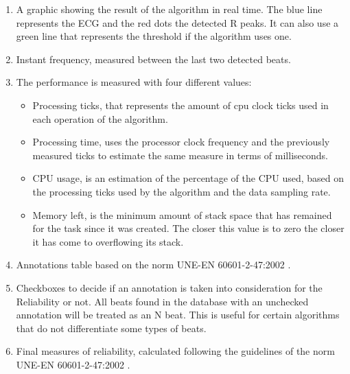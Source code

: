 \begin{enumerate}
    \item  A graphic showing the result of the algorithm in real time. The blue line represents the ECG and the red dots the detected R peaks. It can also use a green line that represents the threshold if the algorithm uses one.
    \item Instant frequency, measured between the last two detected beats.
    \item The performance is measured with four different values:
    \begin{itemize}
        \item Processing ticks, that represents the amount of cpu clock ticks used in each operation of the algorithm.
        \item Processing time, uses the processor clock frequency and the previously measured ticks to estimate the same measure in terms of milliseconds.
        \item CPU usage, is an estimation of the percentage of the CPU used, based on the processing ticks used by the algorithm and the data sampling rate.
        \item Memory left, is the minimum amount of stack space that has remained for the task since it was created.  The closer this value is to zero the closer it has come to overflowing its stack.
    \end{itemize}
    \item Annotations table based on the norm UNE-EN 60601-2-47:2002 \cite{Aenor2002}.
    \item Checkboxes to decide if an annotation is taken into consideration for the Reliability or not. All beats found in the database with an unchecked annotation will be treated as an N beat. This is useful for certain algorithms that do not differentiate some types of beats. 
    \item Final measures of reliability, calculated following the guidelines of the norm UNE-EN 60601-2-47:2002 \cite{Aenor2002}.

\end{enumerate}

